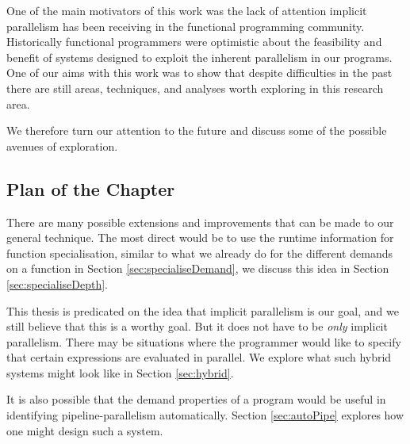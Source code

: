 One of the main motivators of this work was the lack of attention implicit
parallelism has been receiving in the functional programming community. Historically
functional programmers were optimistic about the feasibility and benefit of systems
designed to exploit the inherent parallelism in our programs. One of our aims with
this work was to show that despite difficulties in the past there are still areas,
techniques, and analyses worth exploring in this research area.

We therefore turn our attention to the future and discuss some of the possible
avenues of exploration.

\subsection*{Plan of the Chapter}

There are many possible extensions and improvements that can be made to our
general technique. The most direct would be to use the runtime information for
function specialisation, similar to what we already do for the different
demands on a function in Section \ref{sec:specialiseDemand}, we discuss this
idea in Section \ref{sec:specialiseDepth}.

This thesis is predicated on the idea that implicit parallelism is our goal, and
we still believe that this is a worthy goal. But it does not have to be \emph{only}
implicit parallelism. There may be situations where the programmer would like to
specify that certain expressions are evaluated in parallel. We explore what such
hybrid systems might look like in Section \ref{sec:hybrid}.

It is also possible that the demand properties of a program would be useful in
identifying pipeline-parallelism automatically. Section \ref{sec:autoPipe}
explores how one might design such a system. 
